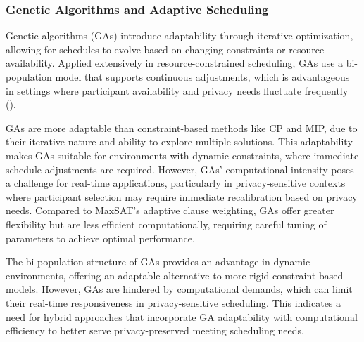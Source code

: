 \begin{spacing}{1.0}
    \subsubsection{Genetic Algorithms and Adaptive Scheduling}
    \indent \indent Genetic algorithms (GAs) introduce adaptability through iterative optimization, allowing for schedules to evolve based on changing constraints or resource availability. Applied extensively in resource-constrained scheduling, GAs use a bi-population model that supports continuous adjustments, which is advantageous in settings where participant availability and privacy needs fluctuate frequently (\cite{peteghem2010}). 
    \par GAs are more adaptable than constraint-based methods like CP and MIP, due to their iterative nature and ability to explore multiple solutions. This adaptability makes GAs suitable for environments with dynamic constraints, where immediate schedule adjustments are required. However, GAs’ computational intensity poses a challenge for real-time applications, particularly in privacy-sensitive contexts where participant selection may require immediate recalibration based on privacy needs. Compared to MaxSAT’s adaptive clause weighting, GAs offer greater flexibility but are less efficient computationally, requiring careful tuning of parameters to achieve optimal performance.
    \par The bi-population structure of GAs provides an advantage in dynamic environments, offering an adaptable alternative to more rigid constraint-based models. However, GAs are hindered by computational demands, which can limit their real-time responsiveness in privacy-sensitive scheduling. This indicates a need for hybrid approaches that incorporate GA adaptability with computational efficiency to better serve privacy-preserved meeting scheduling needs.

\end{spacing}
